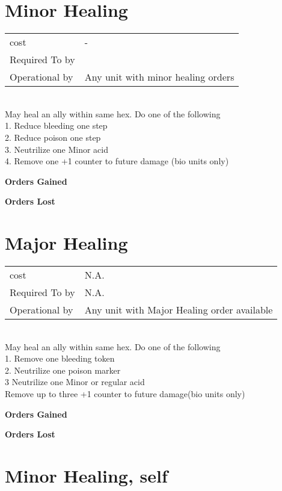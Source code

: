 \section{ Minor Healing }

\begin{tabular}{ll}
  cost & -\\
  Required To by & \\
  Operational by & Any unit with minor healing orders\\

\end{tabular}
\ \\
May heal an ally within same hex. Do one of the following\\ 1. Reduce bleeding one step \\ 2. Reduce poison one step\\ 3. Neutrilize one Minor acid\\ 4. Remove one +1 counter to future damage (bio units only)

{\bf Orders Gained    }

\noindent 

{\bf Orders Lost }

\noindent 
\section{ Major Healing }

\begin{tabular}{ll}
  cost & N.A.\\
  Required To by & N.A.\\
  Operational by & Any unit with Major Healing order available\\

\end{tabular}
\ \\
May heal an ally within same hex. Do one of the following\\ 1. Remove one bleeding token \\ 2. Neutrilize one poison marker\\ 3 Neutrilize one Minor or regular acid\\ Remove up to three +1 counter to future damage(bio units only)

{\bf Orders Gained    }

\noindent 

{\bf Orders Lost }

\noindent 
\section{ Minor Healing, self }

